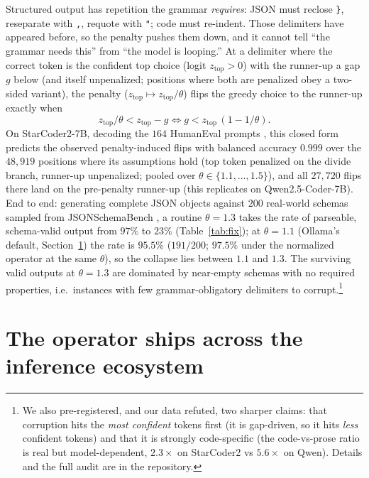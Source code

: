 \documentclass[11pt]{article}
\newcommand{\ztop}{z_{\mathrm{top}}}
\newcommand{\thp}{\theta}
\newcommand{\code}[1]{\texttt{#1}}
\begin{document}
Structured output has repetition the grammar \emph{requires}: JSON must reclose \code{\}}, reseparate
with \code{,}, requote with \code{"}; code must re-indent. Those delimiters have appeared before, so
the penalty pushes them down, and it cannot tell ``the grammar needs this'' from ``the model is
looping.'' At a delimiter where the correct token is the confident top choice (logit $\ztop>0$) with
the runner-up a gap $g$ below (and itself unpenalized; positions where both are penalized obey a
two-sided variant), the penalty ($\ztop\mapsto\ztop/\thp$) flips the greedy choice to the
runner-up exactly when
\begin{equation}\label{eq:thr}
\ztop/\thp < \ztop - g \iff g < \ztop\,(1-1/\thp).
\end{equation}
On StarCoder2-7B, decoding the $164$ HumanEval prompts \citep{chen2021humaneval}, this closed
form predicts the observed penalty-induced flips with balanced
accuracy $0.999$ over the $48{,}919$ positions where its assumptions hold (top token penalized on
the divide branch, runner-up unpenalized; pooled over $\thp\in\{1.1,\dots,1.5\}$), and all
$27{,}720$ flips there land on the pre-penalty
runner-up (this replicates on
Qwen2.5-Coder-7B). End to end: generating complete JSON objects against $200$ real-world schemas
sampled from JSONSchemaBench \citep{geng2025jsonschemabench}, a routine
$\thp=1.3$ takes the rate of parseable, schema-valid output from $97\%$ to $23\%$
(Table~\ref{tab:fix}); at $\thp=1.1$ (Ollama's default, Section~\ref{sec:stacks}) the rate is
$95.5\%$ ($191/200$; $97.5\%$ under the normalized operator at the same $\thp$), so the collapse
lies between $1.1$ and $1.3$. The surviving valid outputs at $\thp=1.3$ are dominated by
near-empty schemas with no required properties, i.e.\ instances with few grammar-obligatory
delimiters to corrupt.\footnote{We also pre-registered, and our data refuted, two
sharper claims: that corruption hits the \emph{most confident} tokens first (it is gap-driven, so it
hits \emph{less} confident tokens) and that it is strongly code-specific (the code-vs-prose ratio is
real but model-dependent, $2.3\times$ on StarCoder2 vs $5.6\times$ on Qwen). Details and the full
audit are in the repository.}

\section{The operator ships across the inference ecosystem}\label{sec:stacks}
\end{document}
